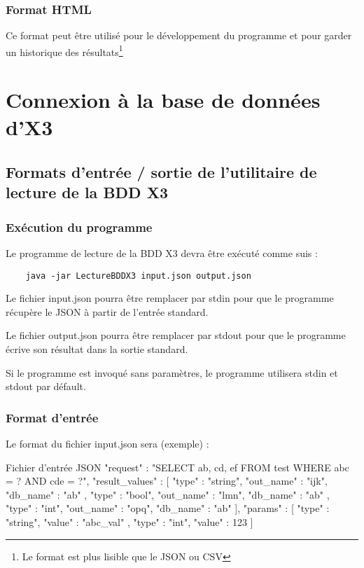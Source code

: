 \subsection{Format HTML}

Ce format peut être utilisé pour le développement du programme et pour garder un historique des résultats\footnote{Le format est plus lisible que le JSON ou CSV}




\chapter{Connexion à la base de données d'X3}

\section{Formats d'entrée / sortie de l'utilitaire de lecture de la BDD X3}

\subsection{Exécution du programme}

Le programme de lecture de la BDD X3 devra être exécuté comme suis :

\begin{verbatim}
    java -jar LectureBDDX3 input.json output.json
\end{verbatim}

Le fichier input.json pourra être remplacer par stdin pour que le programme récupère le JSON à partir de l’entrée standard.

Le fichier output.json pourra être remplacer par stdout pour que le programme écrive son résultat dans la sortie standard.

Si le programme est invoqué sans paramètres, le programme utilisera stdin et stdout par défault.


\subsection{Format d'entrée}

Le format du fichier input.json sera (exemple) :

\begin{Python}{Fichier d'entrée JSON}
    {
        "request" :  "SELECT ab, cd, ef FROM test WHERE abc = ? AND cde = ?",
        "result_values" : [
            { "type" : "string", "out_name" : "ijk", "db_name" : "ab" },
            { "type" : "bool", "out_name" : "lmn", "db_name" : "ab" },
            { "type" : "int", "out_name" : "opq", "db_name" : "ab" }
        ],
        "params" :  [
            { "type" : "string", "value" : "abc_val" },
            { "type" : "int", "value" : 123 }
        ]
    }

\end{Python}

